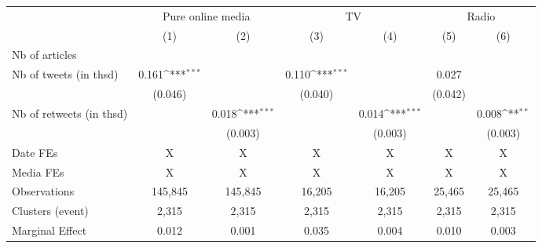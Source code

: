 {
\def\sym#1{\ifmmode^{#1}\else\(^{#1}\)\fi}
\begin{tabular}{l*{6}{c}}
\hline\hline
                    &\multicolumn{2}{c}{Pure online media}      &\multicolumn{2}{c}{TV}                     &\multicolumn{2}{c}{Radio}                  \\\cmidrule(lr){2-3}\cmidrule(lr){4-5}\cmidrule(lr){6-7}
                    &\multicolumn{1}{c}{(1)}         &\multicolumn{1}{c}{(2)}         &\multicolumn{1}{c}{(3)}         &\multicolumn{1}{c}{(4)}         &\multicolumn{1}{c}{(5)}         &\multicolumn{1}{c}{(6)}         \\
\hline
Nb of articles      &                     &                     &                     &                     &                     &                     \\
Nb of tweets (in thsd)&       0.161\sym{***}&                     &       0.110\sym{***}&                     &       0.027         &                     \\
                    &     (0.046)         &                     &     (0.040)         &                     &     (0.042)         &                     \\
Nb of retweets (in thsd)&                     &       0.018\sym{***}&                     &       0.014\sym{***}&                     &       0.008\sym{**} \\
                    &                     &     (0.003)         &                     &     (0.003)         &                     &     (0.003)         \\
\hline
Date FEs            &           X         &           X         &           X         &           X         &           X         &           X         \\
Media FEs           &           X         &           X         &           X         &           X         &           X         &           X         \\
Observations        &     145,845         &     145,845         &      16,205         &      16,205         &      25,465         &      25,465         \\
Clusters (event)    &       2,315         &       2,315         &       2,315         &       2,315         &       2,315         &       2,315         \\
Marginal Effect     &       0.012         &       0.001         &       0.035         &       0.004         &       0.010         &       0.003         \\
\hline\hline
\end{tabular}
}

